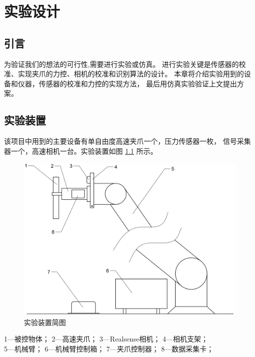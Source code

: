 \chapter{实验设计}

\section{引言}
为验证我们的想法的可行性,需要进行实验或仿真。
进行实验关键是传感器的校准、实现夹爪的力控、相机的校准和识别算法的设计。
本章将介绍实验用到的设备和仪器，传感器的校准和力控的实现方法，
最后用仿真实验验证上文提出方案。

\section{实验装置}
该项目中用到的主要设备有单自由度高速夹爪一个，压力传感器一枚，
信号采集器一个，高速相机一台。实验装置如图 \ref{fig:4-1} 所示。

\begin{figure}[!ht]
  \centering
  \includegraphics[scale=0.4]{chapter04/pic/4-1}
  \caption{实验装置简图}
  \label{fig:4-1}
  \vspace{-0.3cm}
\end{figure}

\vspace{-10pt}
\begin{center}
  1---被控物体； 2---高速夹爪； 3---Realsense相机； 4---相机支架； \\
  5---机械臂； 6---机械臂控制箱； 7---夹爪控制器； 8---数据采集卡；
\end{center}

